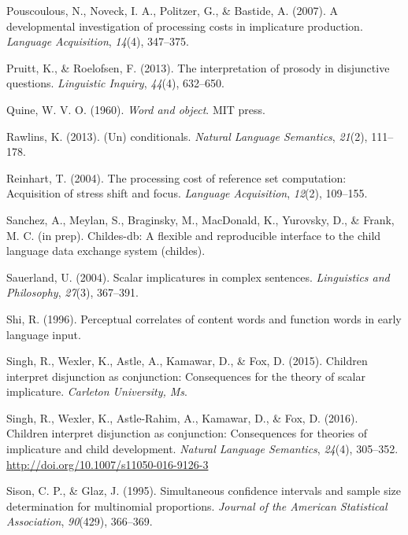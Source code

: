 \documentclass[oneside]{report}
\theoremstyle{definition}
\theoremstyle{definition}
\theoremstyle{definition}
\theoremstyle{remark}
\begin{document}
\hypertarget{ref-pouscoulous2007developmental}{}
Pouscoulous, N., Noveck, I. A., Politzer, G., \& Bastide, A. (2007). A
developmental investigation of processing costs in implicature
production. \emph{Language Acquisition}, \emph{14}(4), 347--375.

\hypertarget{ref-pruitt2013interpretation}{}
Pruitt, K., \& Roelofsen, F. (2013). The interpretation of prosody in
disjunctive questions. \emph{Linguistic Inquiry}, \emph{44}(4),
632--650.

\hypertarget{ref-quine1960word}{}
Quine, W. V. O. (1960). \emph{Word and object}. MIT press.

\hypertarget{ref-rawlins2013conditionals}{}
Rawlins, K. (2013). (Un) conditionals. \emph{Natural Language
Semantics}, \emph{21}(2), 111--178.

\hypertarget{ref-reinhart2004processing}{}
Reinhart, T. (2004). The processing cost of reference set computation:
Acquisition of stress shift and focus. \emph{Language Acquisition},
\emph{12}(2), 109--155.

\hypertarget{ref-childesdb}{}
Sanchez, A., Meylan, S., Braginsky, M., MacDonald, K., Yurovsky, D., \&
Frank, M. C. (in prep). Childes-db: A flexible and reproducible
interface to the child language data exchange system (childes).

\hypertarget{ref-sauerland2004scalar}{}
Sauerland, U. (2004). Scalar implicatures in complex sentences.
\emph{Linguistics and Philosophy}, \emph{27}(3), 367--391.

\hypertarget{ref-shi1996perceptual}{}
Shi, R. (1996). Perceptual correlates of content words and function
words in early language input.

\hypertarget{ref-singh2015children}{}
Singh, R., Wexler, K., Astle, A., Kamawar, D., \& Fox, D. (2015).
Children interpret disjunction as conjunction: Consequences for the
theory of scalar implicature. \emph{Carleton University, Ms}.

\hypertarget{ref-Singh2016}{}
Singh, R., Wexler, K., Astle-Rahim, A., Kamawar, D., \& Fox, D. (2016).
Children interpret disjunction as conjunction: Consequences for theories
of implicature and child development. \emph{Natural Language Semantics},
\emph{24}(4), 305--352. \url{http://doi.org/10.1007/s11050-016-9126-3}

\hypertarget{ref-sison1995simultaneous}{}
Sison, C. P., \& Glaz, J. (1995). Simultaneous confidence intervals and
sample size determination for multinomial proportions. \emph{Journal of
the American Statistical Association}, \emph{90}(429), 366--369.
\end{document}

